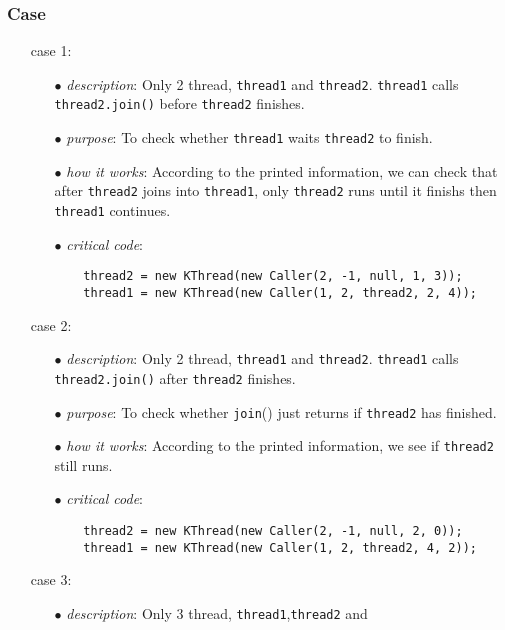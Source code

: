 \documentclass{article}
\begin{document}
\begin{spacing}{1.1}
\subsubsection{Case}
\begin{enumerate}
  \item[] case 1: 
    \begin{enumerate}
      \item[$\bullet$] \textit{description}: Only 2 thread, \texttt{thread1} and \texttt{thread2}. 
	\texttt{thread1} calls \texttt{thread2.join()} before \texttt{thread2} finishes.
      \item[$\bullet$] \textit{purpose}: To check whether \texttt{thread1} waits \texttt{thread2} to finish.
      \item[$\bullet$] \textit{how it works}: According to the printed information, we can check that
	after \texttt{thread2} joins into \texttt{thread1}, only \texttt{thread2} runs until it finishs
	then \texttt{thread1} continues.
      \item[$\bullet$] \textit{critical code}:
	\begin{lstlisting}
	thread2 = new KThread(new Caller(2, -1, null, 1, 3));
	thread1 = new KThread(new Caller(1, 2, thread2, 2, 4));
	\end{lstlisting} 
    \end{enumerate}
  \item[] case 2:
    \begin{enumerate}
      \item[$\bullet$] \textit{description}: Only 2 thread, \texttt{thread1} and \texttt{thread2}.
	\texttt{thread1} calls \texttt{thread2.join()} after \texttt{thread2} finishes.
      \item[$\bullet$] \textit{purpose}: To check whether \texttt{join}() just returns if \texttt{thread2} has finished.
      \item[$\bullet$] \textit{how it works}: According to the printed information, we see if \texttt{thread2}
	still runs.
      \item[$\bullet$] \textit{critical code}:
	\begin{lstlisting}
	thread2 = new KThread(new Caller(2, -1, null, 2, 0));
	thread1 = new KThread(new Caller(1, 2, thread2, 4, 2));
        \end{lstlisting}
      \end{enumerate}
  \item[] case 3:
    \begin{enumerate}
      \item[$\bullet$] \textit{description}: Only 3 thread, \texttt{thread1},\texttt{thread2} and

\end{enumerate}
\end{enumerate}
\end{spacing}
\end{document}
